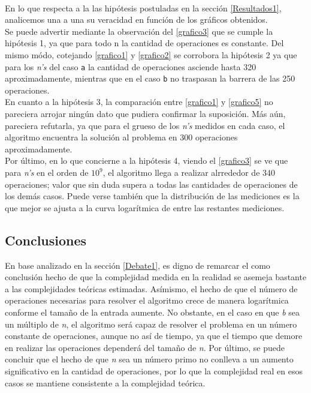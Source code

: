 \paragraph{}
En lo que respecta a la las hipótesis postuladas en la sección \ref{Resultados1}, analicemos una a una su veracidad en función de los gráficos obtenidos.\\
Se puede advertir mediante la observación del  \ref{grafico3} que se cumple la hipótesis 1, ya que para todo n la cantidad de operaciones es constante. Del mismo módo, cotejando \ref{grafico1} y \ref{grafico2} se corrobora la hipótesis 2 ya que para los \textit{n's} del caso \texttt{a} la cantidad de operaciones asciende hasta 320 aproximadamente, mientras que en el caso \texttt{b} no traspasan la barrera de las 250 operaciones.\\
En cuanto a la hipótesis 3, la comparación entre \ref{grafico1} y \ref{grafico5} no pareciera arrojar ningún dato que pudiera confirmar la suposición. Más aún, pareciera refutarla, ya que para el grueso de los \textit{n's} medidos en cada caso, el algoritmo encuentra la solución al problema en 300 operaciones aproximadamente. \\
Por último, en lo que concierne a la hipótesis 4, viendo el \ref{grafico3} se ve que para \textit{n's} en el orden de $10^9$, el algoritmo llega a realizar alrrededor de 340 operaciones; valor que sin duda supera a todas las cantidades de operaciones de los demás casos. Puede verse también que la distribución de las mediciones es la que mejor se ajusta a la curva logarítmica de entre las restantes mediciones. 


\subsection{Conclusiones}
En base analizado en la sección \ref{Debate1}, es digno de remarcar el como conclusión hecho de que la complejidad medida en la realidad se asemeja bastante a las complejidades teóricas estimadas. Asímismo, el hecho de que el número de operaciones necesarias para resolver el algoritmo crece de manera logarítmica conforme el tamaño de la entrada aumente. No obstante, en el caso en que \textit{b} sea un múltiplo de \textit{n}, el algoritmo será capaz de resolver el problema en un número constante de operaciones, aunque no así de tiempo, ya que el tiempo que demore en realizar las operaciones dependerá del tamaño de \textit{n}.
Por último, se puede concluir que el hecho de que \textit{n} sea un número primo no conlleva a un aumento significativo en la cantidad de operaciones, por lo que la complejidad real en esos casos se mantiene consistente a la complejidad teórica.


